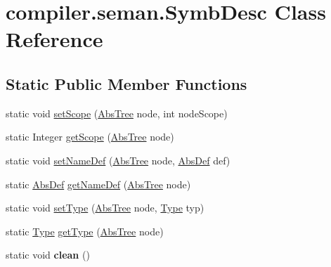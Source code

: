 \hypertarget{classcompiler_1_1seman_1_1_symb_desc}{}\section{compiler.\+seman.\+Symb\+Desc Class Reference}
\label{classcompiler_1_1seman_1_1_symb_desc}
\subsection*{Static Public Member Functions}
\begin{DoxyCompactItemize}
\item 
static void \hyperlink{classcompiler_1_1seman_1_1_symb_desc_a76d9405731181538c620c3bd1e7e1c62}{set\+Scope} (\hyperlink{classcompiler_1_1abstr_1_1tree_1_1_abs_tree}{Abs\+Tree} node, int node\+Scope)
\item 
static Integer \hyperlink{classcompiler_1_1seman_1_1_symb_desc_ae48b37c9f25fad454342652fa331e472}{get\+Scope} (\hyperlink{classcompiler_1_1abstr_1_1tree_1_1_abs_tree}{Abs\+Tree} node)
\item 
static void \hyperlink{classcompiler_1_1seman_1_1_symb_desc_aeccc247afebdb4b5ee21b701ffbe026a}{set\+Name\+Def} (\hyperlink{classcompiler_1_1abstr_1_1tree_1_1_abs_tree}{Abs\+Tree} node, \hyperlink{classcompiler_1_1abstr_1_1tree_1_1def_1_1_abs_def}{Abs\+Def} def)
\item 
static \hyperlink{classcompiler_1_1abstr_1_1tree_1_1def_1_1_abs_def}{Abs\+Def} \hyperlink{classcompiler_1_1seman_1_1_symb_desc_af0e1200fe7e5f3ace19ed1d88dd92c9c}{get\+Name\+Def} (\hyperlink{classcompiler_1_1abstr_1_1tree_1_1_abs_tree}{Abs\+Tree} node)
\item 
static void \hyperlink{classcompiler_1_1seman_1_1_symb_desc_aba233cf3b5e66207203bfc7d42b8ae4b}{set\+Type} (\hyperlink{classcompiler_1_1abstr_1_1tree_1_1_abs_tree}{Abs\+Tree} node, \hyperlink{classcompiler_1_1seman_1_1type_1_1_type}{Type} typ)
\item 
static \hyperlink{classcompiler_1_1seman_1_1type_1_1_type}{Type} \hyperlink{classcompiler_1_1seman_1_1_symb_desc_a3c812018176730dd85b7bf8e35909786}{get\+Type} (\hyperlink{classcompiler_1_1abstr_1_1tree_1_1_abs_tree}{Abs\+Tree} node)
\item 
\mbox{\label{classcompiler_1_1seman_1_1_symb_desc_a8ffc83d2f90182276753654fdffc11a0}} 
static void {\bfseries clean} ()
\end{DoxyCompactItemize}


